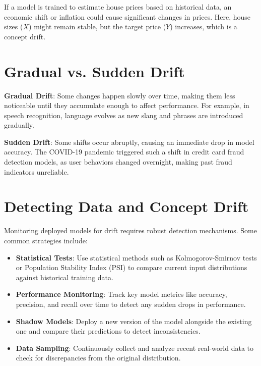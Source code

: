 \documentclass[12pt,openany]{book}
\begin{document}
\begin{examplebox}
     If a model is trained to estimate house prices based on historical data, an economic shift or inflation could cause significant changes in prices. Here, house sizes (\(X\)) might remain stable, but the target price (\(Y\)) increases, which is a concept drift.
\end{examplebox}

\section{Gradual vs. Sudden Drift}

\textbf{Gradual Drift}: Some changes happen slowly over time, making them less noticeable until they accumulate enough to affect performance. For example, in speech recognition, language evolves as new slang and phrases are introduced gradually. \newline

\textbf{Sudden Drift}: Some shifts occur abruptly, causing an immediate drop in model accuracy. The COVID-19 pandemic triggered such a shift in credit card fraud detection models, as user behaviors changed overnight, making past fraud indicators unreliable.

\section{Detecting Data and Concept Drift}

Monitoring deployed models for drift requires robust detection mechanisms. Some common strategies include:

\begin{itemize}
    \item \textbf{Statistical Tests}: Use statistical methods such as Kolmogorov-Smirnov tests or Population Stability Index (PSI) to compare current input distributions against historical training data.
    \item \textbf{Performance Monitoring}: Track key model metrics like accuracy, precision, and recall over time to detect any sudden drops in performance.
    \item \textbf{Shadow Models}: Deploy a new version of the model alongside the existing one and compare their predictions to detect inconsistencies.
    \item \textbf{Data Sampling}: Continuously collect and analyze recent real-world data to check for discrepancies from the original distribution.
\end{itemize}
\end{document}
